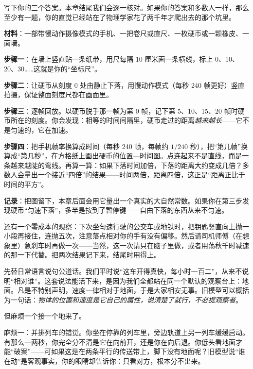 写下你的三个答案。本章结尾我们会逐一核对。如果你的答案和多数人一样，那么至少有一题，你的直觉已经站在了物理学家花了两千年才爬出去的那个坑里。


\begin{experiment}[用慢动作视频称一称“下落”]
\textbf{材料}：一部带慢动作摄像模式的手机、一把卷尺或直尺、一枚硬币或一颗橡皮、一面墙。

\textbf{步骤一}：在墙上竖直贴一条纸带，用尺每隔 10 厘米画一条横线，标上 0、10、20、30……这就是你的“坐标尺”。

\textbf{步骤二}：让硬币从刻度 0 处由静止下落，用慢动作模式（每秒 240 帧更好）竖直拍摄，保证整面刻度尺都在画面里。

\textbf{步骤三}：逐帧回放。以硬币脱手那一帧为第 0 帧，记下第 5、10、15、20 帧时硬币所在的刻度。你会发现：相等的时间间隔里，硬币走过的距离\emph{越来越长}——它不是匀速的，它在加速。

\textbf{步骤四}：把手机帧率换算成时间（每秒 240 帧，每帧约 \(1/240\) 秒），把“第几帧”换算成“第几秒”，在方格纸上画出硬币的位置—时间图。点连起来不是直线，而是一条越来越陡的弯线。再算一算：如果下落时间加倍，下落的距离大约变成几倍？多数人会量出一个接近“四倍”的结果——时间两倍，距离四倍，这正是“距离正比于时间的平方”。

\textbf{记录}：把图留下，本章后面会用它量出一个真实的大自然常数。如果你在第三步发现硬币“匀速下落”，多半是按到了暂停键——自由下落的东西从来不匀速。
\end{experiment}

还有一个零成本的观察：下次坐匀速行驶的公交车或地铁时，把钥匙竖直向上抛一小段再接住，连抛五次，注意落点相对你的手有没有偏移。然后请司机师傅（在想象里）急刹车时再做一次——当然，这一次请只在脑子里做，或者用荡秋千时减速的那一下代替。把两次结果记下来，结尾时用得上。


先替日常语言说句公道话。我们平时说“这车开得真快，每小时一百二”，从来不说明“相对谁”。这套说法能活下来，是因为我们全都站在同一个默认的观察台上：地面。凡是不特别声明，速度一律相对于地面，于是大家相安无事。旧模型可以概括为一句话：\emph{物体的位置和速度是它自己的属性，说清楚了就行，不必提观察者}。

但麻烦一个接一个地来了。

麻烦一：并排列车的错觉。你坐在停靠的列车里，旁边轨道上另一列车缓缓启动。有那么一两秒，你完全分不清是它在向前开，还是你在向后退。你低头看地面才能“破案”——可如果这是在两条平行的传送带上，脚下没有地面呢？旧模型说“谁在动”是客观事实，你的眼睛却告诉你：只看对方，根本分不出来。

